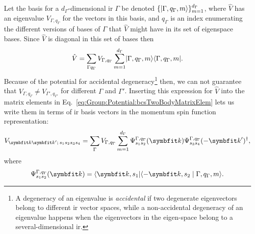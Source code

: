 Let the basis for a $d_\Gamma$-dimensional \ac{ir} $\Gamma$ be denoted $\{\lvert \Gamma,q_\Gamma,m \rangle\}_{m=1}^{d_\Gamma}$, where $\hat{V}$ has an eigenvalue $V_{\Gamma,q_\Gamma}$
for the vectors in this basis, and $q_\Gamma$ is an index enumerating the different versions of bases of $\Gamma$ that $\hat{V}$ might have
in its set of eigenspace bases. Since $\hat{V}$ is diagonal in this set of bases then
\begin{equation}
    \label{eq:Group:Potential:potIrrepDecomp}
    \hat{V} = \sum_{\Gamma q_\Gamma}V_{\Gamma,q_\Gamma}\sum_{m=1}^{d_\Gamma}\lvert \Gamma,q_\Gamma,m \rangle\langle \Gamma,q_\Gamma,m \rvert.
\end{equation}
Because of the potential for accidental degeneracy\footnote{A degeneracy of an eigenvalue is \emph{accidental} if two degenerate eigenvectors belong to different \ac{ir} vector spaces,
while a non-accidental degeneracy of an eigenvalue happens when the eigenvectors in the eigen-space belong to a several-dimensional \ac{ir}.} then,
we can not guarantee that $V_{\Gamma,q_\Gamma}\neq V_{\Gamma',q_{\Gamma'}}$ for different $\Gamma$ and $\Gamma'$.
Inserting this expression for $\hat{V}$ into the matrix elements in Eq.~\eqref{eq:Group:Potential:bcsTwoBodyMatrixElem} lets us write them in terms of
\ac{ir} basis vectors in the momentum spin function representation:
\begin{equation}
    \label{eq:Group:Potential:irrepPotMatrixElem}
    V_{\v{k}\v{k}';\,s_1s_2s_3s_4} = \sum_\Gamma V_{\Gamma,q_\Gamma}\sum_{m=1}^{d_\Gamma}\Psi_{s_1s_2}^{\Gamma,q_\Gamma}(\v{k})\Psi_{s_3s_4}^{\Gamma,q_\Gamma}(-\v{k}')^\dagger,
\end{equation}
where
\begin{equation}
    \label{eq:Group:Potential:irrepPotMatrixElem:coeff}
    \Psi_{s_1s_2}^{\Gamma,q_\Gamma}(\v{k}) = \bra{\v{k},s_1}\braket{-\v{k},s_2}{\Gamma,q_\Gamma,m}.
\end{equation}

